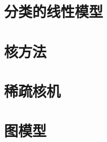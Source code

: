 \chapter{分类的线性模型}






%
%
%
%
%
%
%
%
%
%
%
%
%
%
\chapter{核方法}





\chapter{稀疏核机}






\chapter{图模型}







